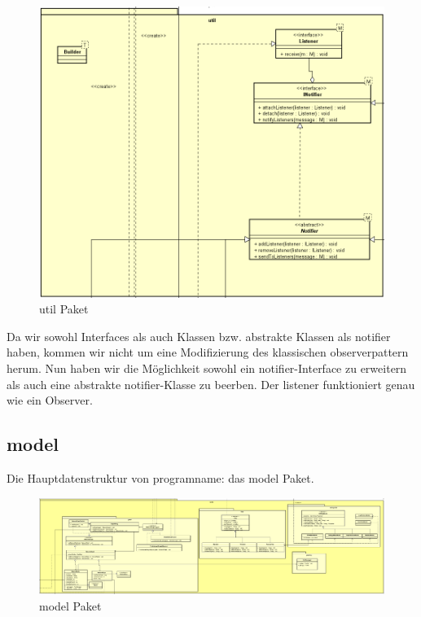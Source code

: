 \begin{figure}[H]
  \centering
  \includegraphics[width=\textwidth]{../diagramimages/util.png}
  \caption{util Paket}
\end{figure}

Da wir sowohl Interfaces als auch Klassen bzw. abstrakte Klassen als
\gls{notifier} haben, kommen wir nicht um eine Modifizierung des klassischen
\gls{observerpattern} herum. Nun haben wir die Möglichkeit sowohl ein
\gls{notifier}-Interface zu erweitern als auch eine abstrakte
\gls{notifier}-Klasse zu beerben. Der \gls{listener} funktioniert genau wie ein
Observer.


\subsection{model}


Die Hauptdatenstruktur von \gls{programname}: das model Paket.

\begin{figure}[H]
  \centering
  \includegraphics[width=\textwidth]{../diagramimages/model.png}
  \caption{model Paket}
\end{figure}

